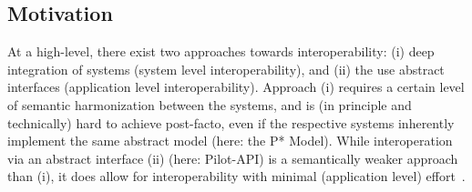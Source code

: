 \documentclass[conference]{IEEEtran}
\begin{document}
\subsection{Motivation} 





%
%
% 
% 

At a high-level, there exist two approaches towards interoperability:
(i) deep integration of systems (system level interoperability), and
(ii) the use abstract interfaces (application level interoperability).
Approach (i) requires a certain level of semantic harmonization
between the systems, and is (in principle and technically) hard to
achieve post-facto, even if the respective systems inherently
implement the same abstract model (here: the P* Model).  While
interoperation via an abstract interface (ii) (here: Pilot-API) is a
semantically weaker approach than (i), it does allow for
interoperability with minimal (application level)
effort~\cite{saga_bigjob_condor_cloud,saga_gin}.
\end{document}

